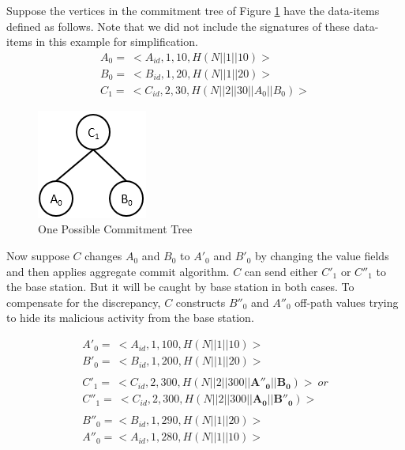 		\begin{exmp}
			\label{ex1:malicious-activity}
			Suppose the vertices in the commitment tree of Figure \ref{fig:malicious-activity} have the data-items defined as follows.
			Note that we did not include the signatures of these data-items in this example for simplification.
			\begin{equation*}
				\begin{array}{l}
					A_{0} =\ <A_{id},1,10, H(N||1||10)>\\
					B_{0} =\ <B_{id},1,20, H(N||1||20)>\\
					C_{1} =\ <C_{id},2,30, H(N||2||30||A_{0}||B_{0})>
				\end{array}
			\end{equation*}

			\begin{figure}[t]
				\centering
				\includegraphics{images/commitment-tree-2.png}
				\caption{One Possible Commitment Tree}
				\label{fig:malicious-activity}
			\end{figure}

			Now suppose $C$ changes $A_{0}$ and $B_{0}$ to $A'_{0}$ and $B'_{0}$ by changing the value fields and then applies aggregate commit algorithm.
			$C$ can send either $C'_{1}$ or $C''_{1}$ to the base station.
			But it  will be caught by base station in both cases.
			To compensate for the discrepancy, $C$ constructs $B''_{0}$ and $A''_{0}$ off-path values trying to hide its malicious activity from the base station.

			\begin{equation*}
				\begin{array}{l}
					A'_{0} =\ <A_{id},1,100, H(N||1||10)>\\
					B'_{0} =\ <B_{id},1,200, H(N||1||20)>\\
					\\
					C'_{1} =\ <C_{id},2,300, H(N||2||300||\mathbf{A''_{0}}||\mathbf{B_{0}})>\ or \\ 
					C''_{1} =\ <C_{id},2,300, H(N||2||300||\mathbf{A_{0}}||\mathbf{B''_{0}})>\\
					\\
					B''_{0} = <B_{id},1,290,H(N||1||20)>\\
					A''_{0} = <A_{id},1,280,H(N||1||10)>
				\end{array}
			\end{equation*}


\end{exmp}
